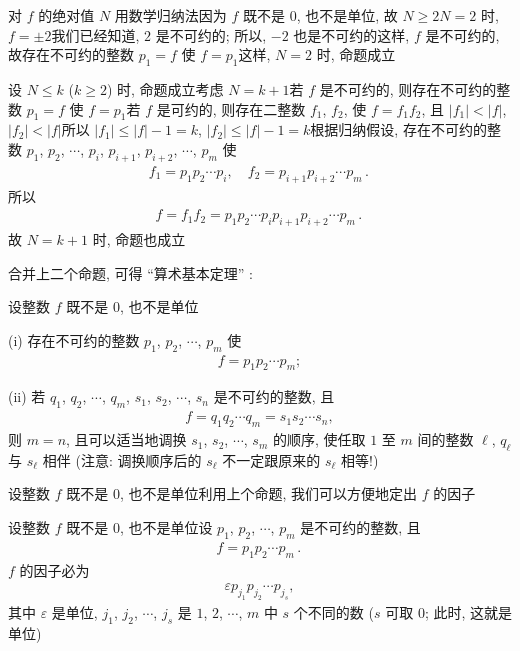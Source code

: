 \begin{pf}
    对 $f$ 的绝对值 $N$ 用数学归纳法\period 因为 $f$ 既不是 $0$, 也不是单位, 故 $N \geq 2$\period $N = 2$ 时, $f = \pm 2$\period 我们已经知道, $2$ 是不可约的; 所以, $-2$ 也是不可约的\period 这样, $f$ 是不可约的, 故存在不可约的整数 $p_1 = f$ 使 $f = p_1$\period 这样, $N = 2$ 时, 命题成立\period

    设 $N \leq k$ ($k \geq 2$) 时, 命题成立\period 考虑 $N = k+1$\period 若 $f$ 是不可约的, 则存在不可约的整数 $p_1 = f$ 使 $f = p_1$\period 若 $f$ 是可约的, 则存在二整数 $f_1$, $f_2$, 使 $f = f_1 f_2$, 且 $|f_1| < |f|$, $|f_2| < |f|$\period 所以 $|f_1| \leq |f| - 1 = k$, $|f_2| \leq |f| - 1 = k$\period 根据归纳假设, 存在不可约的整数 $p_1$, $p_2$, $\cdots$, $p_i$, $p_{i+1}$, $p_{i+2}$, $\cdots$, $p_m$ 使
    \begin{align*}
        f_1 = p_1 p_2 \cdots p_i, \quad f_2 = p_{i+1} p_{i+2} \cdots p_m \period
    \end{align*}
    所以
    \begin{align*}
        f = f_1 f_2 = p_1 p_2 \cdots p_i p_{i+1} p_{i+2} \cdots p_m \period
    \end{align*}
    故 $N = k+1$ 时, 命题也成立\period
\end{pf}

合并上二个命题, 可得 ``算术基本定理'' :
\begin{proposition}
    设整数 $f$ 既不是 $0$, 也不是单位\period

    (i) 存在不可约的整数 $p_1$, $p_2$, $\cdots$, $p_m$ 使
    \begin{align*}
        f = p_1 p_2 \cdots p_m;
    \end{align*}

    (ii) 若 $q_1$, $q_2$, $\cdots$, $q_m$, $s_1$, $s_2$, $\cdots$, $s_n$ 是不可约的整数, 且
    \begin{align*}
        f = q_1 q_2 \cdots q_m = s_1 s_2 \cdots s_n,
    \end{align*}
    则 $m = n$, 且可以适当地调换 $s_1$, $s_2$, $\cdots$, $s_m$ 的顺序, 使任取 $1$ 至 $m$ 间的整数 $\ell$, $q_\ell$ 与 $s_\ell$ 相伴 (注意: 调换顺序后的 $s_\ell$ 不一定跟原来的 $s_\ell$ 相等!)\period
\end{proposition}

设整数 $f$ 既不是 $0$, 也不是单位\period 利用上个命题, 我们可以方便地定出 $f$ 的因子\period

\begin{proposition}
    设整数 $f$ 既不是 $0$, 也不是单位\period 设 $p_1$, $p_2$, $\cdots$, $p_m$ 是不可约的整数, 且
    \begin{align*}
        f = p_1 p_2 \cdots p_m \period
    \end{align*}
    $f$ 的因子必为
    \begin{align*}
        \varepsilon p_{j_1} p_{j_2} \cdots p_{j_s} \tag*{(\myStar)},
    \end{align*}
    其中 $\varepsilon$ 是单位, $j_1$, $j_2$, $\cdots$, $j_s$ 是 $1$, $2$, $\cdots$, $m$ 中 $s$ 个不同的数 ($s$ 可取 $0$; 此时, 这就是单位)\period
\end{proposition}

